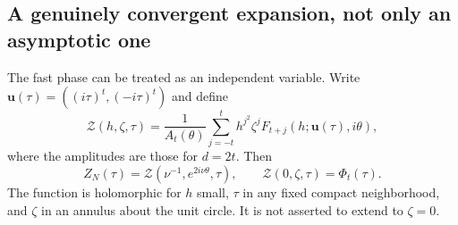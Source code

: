 \documentclass[11pt,a4paper]{article}
\numberwithin{equation}{section}
\theoremstyle{definition}
\theoremstyle{remark}
\newcommand{\bu}{\boldsymbol u}
\begin{document}
\subsection{A genuinely convergent expansion, not only an asymptotic one}
The fast phase can be treated as an independent variable. Write
$\bu(\tau)=((i\tau)^t,(-i\tau)^t)$ and define
\begin{equation}\label{ic:eq:Zinterpol}
 \mathcal Z(h,\zeta,\tau)=\frac1{A_t(\theta)}
 \sum_{j=-t}^t h^{j^2}\zeta^j
 F_{t+j}(h;\bu(\tau),i\theta),
\end{equation}
where the amplitudes are those for $d=2t$. Then
\begin{equation}\label{ic:eq:Zrestriction}
 Z_N(\tau)=\mathcal Z\left(\nu^{-1},e^{2i\nu\theta},\tau\right),
 \qquad \mathcal Z(0,\zeta,\tau)=\Phi_t(\tau).
\end{equation}
The function is holomorphic for $h$ small, $\tau$ in any fixed compact
neighborhood, and $\zeta$ in an annulus about the unit circle. It is not
asserted to extend to $\zeta=0$.
\end{document}
